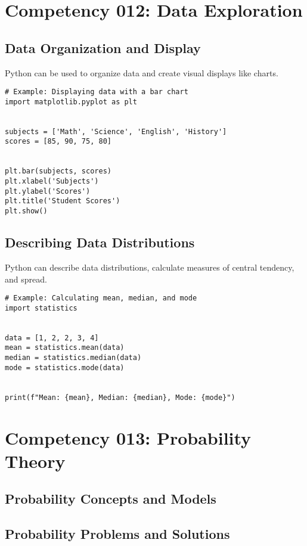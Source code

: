 \documentclass{book}
\begin{document}
\section{Competency 012: Data Exploration}
\subsection{Data Organization and Display}
Python can be used to organize data and create visual displays like charts.


\begin{lstlisting}[style=pythonstyle]
# Example: Displaying data with a bar chart
import matplotlib.pyplot as plt


subjects = ['Math', 'Science', 'English', 'History']
scores = [85, 90, 75, 80]


plt.bar(subjects, scores)
plt.xlabel('Subjects')
plt.ylabel('Scores')
plt.title('Student Scores')
plt.show()
\end{lstlisting}


\subsection{Describing Data Distributions}
Python can describe data distributions, calculate measures of central tendency, and spread.


\begin{lstlisting}[style=pythonstyle]
# Example: Calculating mean, median, and mode
import statistics


data = [1, 2, 2, 3, 4]
mean = statistics.mean(data)
median = statistics.median(data)
mode = statistics.mode(data)


print(f"Mean: {mean}, Median: {median}, Mode: {mode}")
\end{lstlisting}


\section{Competency 013: Probability Theory}
\subsection{Probability Concepts and Models}
\subsection{Probability Problems and Solutions}
\end{document}
